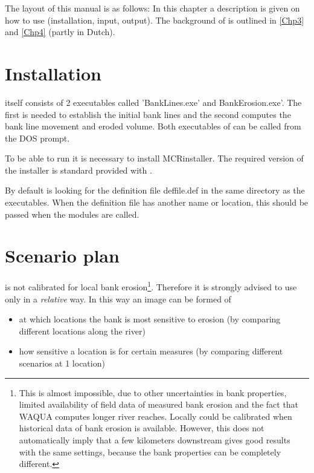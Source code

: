 The layout of this manual is as follows: In this chapter a description is given on how to use \dfastbe (installation, input, output).
The background of \dfastbe is outlined in \autoref{Chp3} and \autoref{Chp4} (partly in Dutch).

\section{Installation}

\dfastbe itself consists of 2 executables called 'BankLines.exe' and BankErosion.exe'.
The first is needed to establish the initial bank lines and the second computes the bank line movement and eroded volume.
Both executables of \dfastbe can be called from the DOS prompt.

To be able to run \dfastbe it is necessary to install MCRinstaller.
The required version of the installer is standard provided with \dfastbe.

By default \dfastbe is looking for the definition file deffile.def in the same directory as the executables.
When the definition file has another name or location, this should be passed when the modules are called.

\section{Scenario plan}

\dfastbe is not calibrated for local bank erosion\footnote{This is almost impossible, due to other uncertainties in bank properties, limited availability of field data of measured bank erosion and the fact that WAQUA computes longer river reaches.
Locally \dfastbe could be calibrated when historical data of bank erosion is available.
However, this does not automatically imply that a few kilometers downstream \dfastbe gives good results with the same settings, because the bank properties can be completely different.}.
Therefore it is strongly advised to use \dfastbe only in a \emph{relative} way.
In this way an image can be formed of

\begin{itemize}
\item at which locations the bank is most sensitive to erosion (by comparing different locations along the river)
\item how sensitive a location is for certain measures (by comparing different scenarios at 1 location)
\end{itemize}

